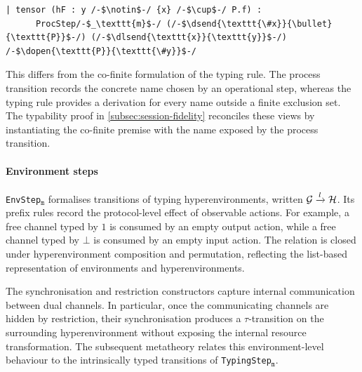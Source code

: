 \begin{lstlisting}[language=Lean4]
  | tensor (hF : y /-$\notin$-/ {x} /-$\cup$-/ P.f) :
      ProcStep/-$_\texttt{m}$-/ (/-$\dsend{\texttt{\#x}}{\bullet}{\texttt{P}}$-/) (/-$\dlsend{\texttt{x}}{\texttt{y}}$-/) /-$\dopen{\texttt{P}}{\texttt{\#y}}$-/
\end{lstlisting}

This differs from the co-finite formulation of the typing rule. The process transition records the concrete name chosen by an operational step, whereas the typing rule provides a derivation for every name outside a finite exclusion set. The typability proof in \cref{subsec:session-fidelity} reconciles these views by instantiating the co-finite premise with the name exposed by the process transition.

\paragraph{Environment steps}
\texttt{EnvStep}$_{\texttt{m}}$ formalises transitions of typing hyperenvironments, written $\mathcal{G} \xrightarrow{l} \mathcal{H}$. Its prefix rules record the protocol-level effect of observable actions. For example, a free channel typed by $1$ is consumed by an empty output action, while a free channel typed by $\bot$ is consumed by an empty input action. The relation is closed under hyperenvironment composition and permutation, reflecting the list-based representation of environments and hyperenvironments.

The synchronisation and restriction constructors capture internal communication between dual channels. In particular, once the communicating channels are hidden by restriction, their synchronisation produces a $\tau$-transition on the surrounding hyperenvironment without exposing the internal resource transformation. The subsequent metatheory relates this environment-level behaviour to the intrinsically typed transitions of \texttt{TypingStep}$_{\texttt{m}}$.
